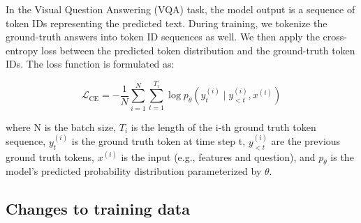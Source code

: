 \documentclass{article} %
\begin{document}
In the Visual Question Answering (VQA) task, the model output is a sequence of token IDs representing the predicted text. During training, we tokenize the ground-truth answers into token ID sequences as well. We then apply the cross-entropy loss between the predicted token distribution and the ground-truth token IDs. The loss function is formulated as:


\[
\mathcal{L}_{\text{CE}} = -\frac{1}{N} \sum_{i=1}^{N} \sum_{t=1}^{T_i} \log p_{\theta}(y_t^{(i)} \mid y_{<t}^{(i)}, x^{(i)})
\]

where N is the batch size, $T_i$ is the length of the i-th ground truth token sequence, $y_t^{(i)}$ is the ground truth token at time step t, $y_{<t}^{(i)}$ are the previous ground truth tokens, $x^{(i)}$ is the input (e.g., features and question), and $p_{\theta}$ is the model’s predicted probability distribution parameterized by $\theta$.


\subsection{Changes to training data}




\end{document}

